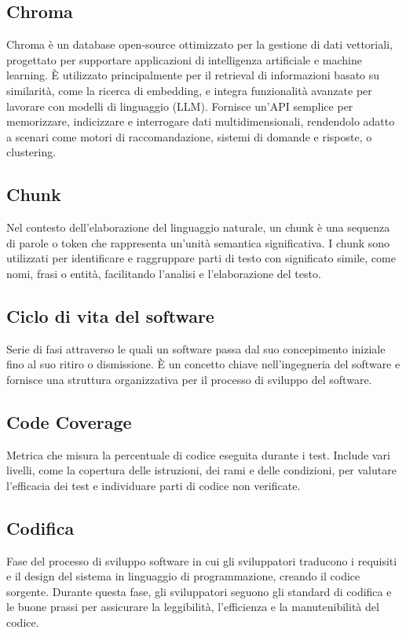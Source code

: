 \hypertarget{sec:chroma}{}
\subsection*{Chroma}
Chroma è un database open-source ottimizzato per la gestione di dati vettoriali, progettato per supportare applicazioni di intelligenza artificiale e 
machine learning. È utilizzato principalmente per il retrieval di informazioni basato su similarità, come la ricerca di embedding, e integra funzionalità 
avanzate per lavorare con modelli di linguaggio (LLM). Fornisce un'API semplice per memorizzare, indicizzare e interrogare dati multidimensionali, 
rendendolo adatto a scenari come motori di raccomandazione, sistemi di domande e risposte, o clustering.

\hypertarget{sec:chunk}{}
\subsection*{Chunk}
Nel contesto dell'elaborazione del linguaggio naturale, un chunk è una sequenza di parole o token che rappresenta un'unità semantica significativa.
I chunk sono utilizzati per identificare e raggruppare parti di testo con significato simile, come nomi, frasi o entità, facilitando l'analisi e l'elaborazione
del testo.

\hypertarget{sec:ciclo_di_vita}{}
\subsection*{Ciclo di vita del software}
Serie di fasi attraverso le quali un software passa dal suo concepimento iniziale fino al suo ritiro o dismissione. È un concetto chiave nell'ingegneria 
del software e fornisce una struttura organizzativa per il processo di sviluppo del software.

\hypertarget{sec:code_coverage}{}
\subsection*{Code Coverage}
Metrica che misura la percentuale di codice eseguita durante i test. Include vari livelli, come la copertura delle istruzioni, dei rami e delle condizioni, per valutare l’efficacia dei test e individuare parti di codice non verificate.

\hypertarget{sec:codifica}{}
\subsection*{Codifica}
Fase del processo di sviluppo software in cui gli sviluppatori traducono i requisiti e il design del sistema in linguaggio di programmazione, creando il 
codice sorgente. Durante questa fase, gli sviluppatori seguono gli standard di codifica e le buone prassi per assicurare la leggibilità, l’efficienza e la 
manutenibilità del codice.

